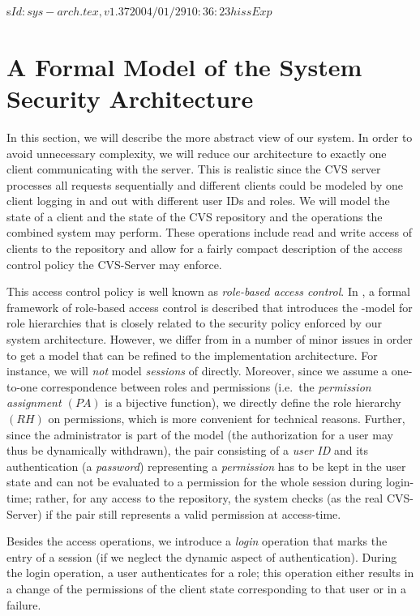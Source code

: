 s\rcsInfo $Id: sys-arch.tex,v 1.37 2004/01/29 10:36:23 hiss Exp $

\chapter{A Formal Model of the System Security Architecture}\label{cha:sys-arch}

In this section, we will describe the more abstract view of our system. In order
to avoid unnecessary complexity, we will reduce our architecture to exactly one
client communicating with the server.  This is realistic since the CVS server
processes all requests sequentially and different clients could be modeled by
one client logging in and out with different user IDs and roles.  We will model
the state of a client and the state of the CVS repository and the operations the
combined system may perform.  These operations include read and write access of
clients to the repository and allow for a fairly compact description of the
access control policy the CVS-Server may enforce.

This access control policy is well known as \emph{role-based access
  control}. In
\cite{sandhu.ea:role-based:1996}, a formal framework of role-based
access control is described that introduces the \rbac-model for role
hierarchies that is closely related to the security policy enforced by
our system architecture.  However, we differ from \rbac{} in a number of
minor issues in order to get a model that can be refined to the
implementation architecture.  For instance, we will \emph{not} model
\emph{sessions} of \rbac directly.  Moreover, since we assume a
one-to-one correspondence between roles and permissions (i.e.\ the
\emph{permission assignment $(PA)$} is a
bijective function), we directly define the role hierarchy $(RH)$ on
permissions, which is more convenient for technical reasons.  Further,
since the administrator is part of the model (the authorization for a
user may thus be dynamically withdrawn), the pair consisting of a
\emph{user ID} and its authentication (a
\emph{password}) representing a \emph{permission} has
to be kept in the user state and can not be evaluated to a permission
for the whole session during login-time; rather, for any access to the
repository, the system checks (as the real CVS-Server) if the pair
still represents a valid permission at access-time.

Besides the access operations, we introduce a
\emph{login} operation that marks the entry of a session
(if we neglect the dynamic aspect of authentication).  During the
login operation, a user authenticates for a role; this operation
either results in a change of the permissions of the client state
corresponding to that user or in a failure.


